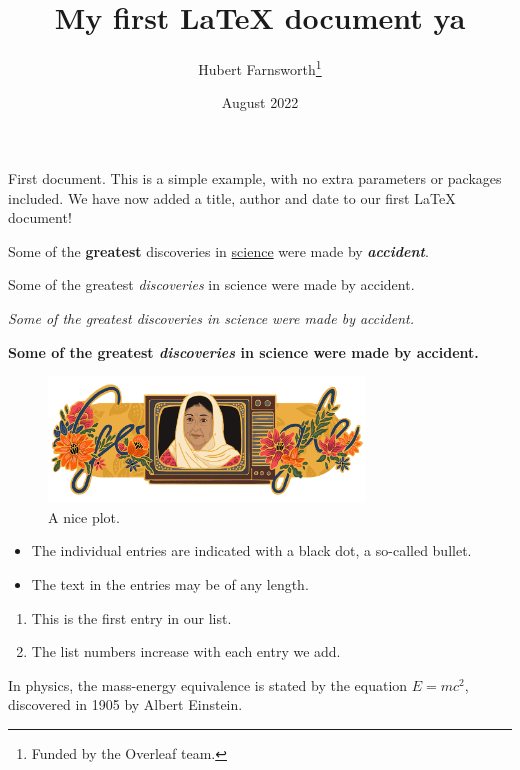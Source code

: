 \documentclass{article}
\title{My first LaTeX document ya}
\author{Hubert Farnsworth\thanks{Funded by the Overleaf team.}}
\date{August 2022}
\begin{document}
\maketitle


First document. This is a simple example, with no
extra parameters or packages included.
We have now added a title, author and date to our first \LaTeX{} document!


Some of the \textbf{greatest}
discoveries in \underline{science}
were made by \textbf{\textit{accident}}.

Some of the greatest \emph{discoveries} in science
were made by accident.

\textit{Some of the greatest \emph{discoveries}
    in science were made by accident.}

\textbf{Some of the greatest \emph{discoveries}
    in science were made by accident.}


\begin{figure}[h]
    \centering
    \includegraphics[width=0.75\textwidth]{test.png}
    \caption{A nice plot.}
    \label{fig:test}
\end{figure}

\begin{itemize}
    \item The individual entries are indicated with a black dot, a so-called bullet.
    \item The text in the entries may be of any length.
\end{itemize}

\begin{enumerate}
    \item This is the first entry in our list.
    \item The list numbers increase with each entry we add.
\end{enumerate}


In physics, the mass-energy equivalence is stated
by the equation $E=mc^2$, discovered in 1905 by Albert Einstein.
\end{document}
